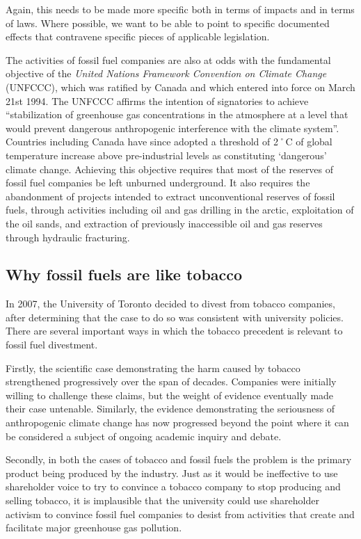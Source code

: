 \begin{vcom}
	Again, this needs to be made more specific both in terms of impacts and in terms of laws. Where possible, we want to be able to point to specific documented effects that contravene specific pieces of applicable legislation.
\end{vcom}


The activities of fossil fuel companies are also at odds with the fundamental objective of the \emph{United Nations Framework Convention on Climate Change} (UNFCCC), which was ratified by Canada and which entered into force on March 21st 1994.
The UNFCCC affirms the intention of signatories to achieve ``stabilization of greenhouse gas concentrations in the atmosphere at a level that would prevent dangerous anthropogenic interference with the climate system''.
Countries including Canada have since adopted a threshold of 2˚C of global temperature increase above pre-industrial levels as constituting `dangerous' climate change.
Achieving this objective requires that most of the reserves of fossil fuel companies be left unburned underground.
It also requires the abandonment of projects intended to extract unconventional reserves of fossil fuels, through activities including oil and gas drilling in the arctic, exploitation of the oil sands, and extraction of previously inaccessible oil and gas reserves through hydraulic fracturing.



	\subsection{Why fossil fuels are like tobacco}


In 2007, the University of Toronto decided to divest from tobacco companies, after determining that the case to do so was consistent with university policies.
There are several important ways in which the tobacco precedent is relevant to fossil fuel divestment.


Firstly, the scientific case demonstrating the harm caused by tobacco strengthened progressively over the span of decades.
Companies were initially willing to challenge these claims, but the weight of evidence eventually made their case untenable.
Similarly, the evidence demonstrating the seriousness of anthropogenic climate change has now progressed beyond the point where it can be considered a subject of ongoing academic inquiry and debate.


Secondly, in both the cases of tobacco and fossil fuels the problem is the primary product being produced by the industry.
Just as it would be ineffective to use shareholder voice to try to convince a tobacco company to stop producing and selling tobacco, it is implausible that the university could use shareholder activism to convince fossil fuel companies to desist from activities that create and facilitate major greenhouse gas pollution.



